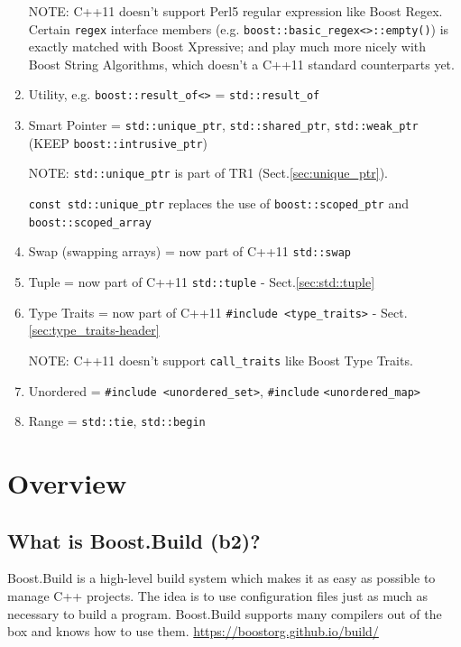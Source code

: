 \begin{enumerate}
  NOTE: C++11 doesn't support Perl5 regular expression like Boost Regex. Certain
  \verb!regex! interface members (e.g. \verb!boost::basic_regex<>::empty()!) is
  exactly matched with Boost Xpressive; and play much more nicely with Boost
  String Algorithms, which doesn't a C++11 standard counterparts yet.
  
  \item Utility, e.g. \verb!boost::result_of<>! =  \verb!std::result_of!
  
  \item Smart Pointer = \verb!std::unique_ptr!, \verb!std::shared_ptr!,
  \verb!std::weak_ptr! (KEEP \verb!boost::intrusive_ptr!)
  
  NOTE: \verb!std::unique_ptr! is part of TR1 (Sect.\ref{sec:unique_ptr}).
  
  \verb!const std::unique_ptr! replaces the use of \verb!boost::scoped_ptr! and
  \verb!boost::scoped_array!
  
  \item Swap (swapping arrays) = now part of C++11 \verb!std::swap!
  
  \item Tuple = now part of C++11 \verb!std::tuple! - Sect.\ref{sec:std::tuple}
  
  \item Type Traits = now part of C++11 \verb!#include <type_traits>! -
  Sect.\ref{sec:type_traits-header}
  
  NOTE: C++11 doesn't support \verb!call_traits! like Boost Type Traits.
  
  \item Unordered = \verb!#include <unordered_set>!, \verb!#include!
  \verb!<unordered_map>!
   
  \item Range = \verb!std::tie!, \verb!std::begin!
\end{enumerate}


\section{Overview}

\subsection{What is Boost.Build (b2)?}
\label{sec:Boost.Build}
\label{sec:b2-program}

Boost.Build is a high-level build system which makes it as easy as possible to
manage C++ projects.
The idea is to use configuration files just as much as necessary to build a
program.
Boost.Build supports many compilers out of the box and knows how to use them.
\url{https://boostorg.github.io/build/}

